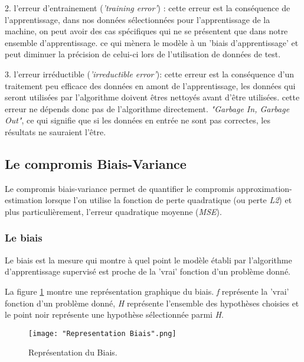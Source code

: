 \documentclass[a4paper]{article}
\begin{document}
2. l'erreur d'entrainement (\textit{'training error'}) : cette erreur est la conséquence de l'apprentissage, dans nos données sélectionnées pour l'apprentissage de la machine, on peut avoir des cas spécifiques qui ne se présentent que dans notre ensemble d'apprentissage. ce qui mènera le modèle à un 'biais d'apprentissage' et peut diminuer la précision de celui-ci lors de l'utilisation de données de test.\newline

3. l'erreur irréductible (\textit{'irreductible error'}): cette erreur est la conséquence d'un traitement peu efficace des données en amont de l'apprentissage, les données qui seront utilisées par l'algorithme doivent êtres nettoyés avant d'être utilisées. cette erreur ne dépends donc pas de l'algorithme directement.\newline
 \textit{"Garbage In, Garbage Out"}, ce qui signifie que si les données en entrée ne sont pas correctes, les résultats ne sauraient l'être. \newline

\newpage

\subsection{Le compromis Biais-Variance}

Le compromis biais-variance permet de quantifier le compromis approximation-estimation lorsque l'on utilise la fonction de perte quadratique (ou perte \textit{L2}) et plus particulièrement, l'erreur quadratique moyenne (\textit{MSE}).

\subsubsection{Le biais}
Le biais est la mesure qui montre à quel point le modèle établi par l'algorithme d'apprentissage supervisé est proche de la 'vrai' fonction d'un problème donné. \newline

La figure \ref{BiasRepresentation} montre une représentation graphique du biais. \textit{f} représente la 'vrai' fonction d'un problème donné, \textit{H} représente l'ensemble des hypothèses choisies et le point noir représente une hypothèse sélectionnée parmi \textit{H}. \newline

\begin{figure}[!h]
	\centering
	\texttt{[image: "Representation Biais".png]}
	\caption{Représentation du Biais.}
	\cite{BiasVarianceTradeoffTextbooksUpdate}
	\label{BiasRepresentation}
\end{figure}
\end{document}
